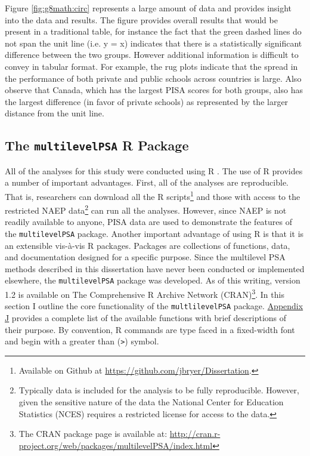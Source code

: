 \documentclass[letterpaper,12pt]{article} %
\begin{document}
Figure \ref{fig:g8math:circ} represents a large amount of data and provides insight into the data and results. The figure provides overall results that would be present in a traditional table, for instance the fact that the green dashed lines do not span the unit line (i.e. y = x) indicates that there is a statistically significant difference between the two groups. However additional information is difficult to convey in tabular format. For example, the rug plots indicate that the spread in the performance of both private and public schools across countries is large. Also observe that Canada, which has the largest PISA scores for both groups, also has the largest difference (in favor of private schools) as represented by the larger distance from the unit line.


\subsection{The \texttt{multilevelPSA} R Package}


All of the analyses for this study were conducted using R \cite{rdevelopment}. The use of R provides a number of important advantages. First, all of the analyses are reproducible. That is, researchers can download all the R scripts\footnote{Available on Github at \url{https://github.com/jbryer/Dissertation}.} and those with access to the restricted NAEP data\footnote{Typically data is included for the analysis to be fully reproducible. However, given the sensitive nature of the data the National Center for Education Statistics (NCES) requires a restricted license for access to the data.} can run all the analyses. However, since NAEP is not readily available to anyone, PISA data are used to demonstrate the features of the \texttt{multilevelPSA} package. Another important advantage of using R is that it is an extensible vis-\`{a}-vis R packages. Packages are collections of functions, data, and documentation designed for a specific purpose. Since the multilevel PSA methods described in this dissertation have never been conducted or implemented elsewhere, the \texttt{multilevelPSA} package was developed. As of this writing, version 1.2 is available on The Comprehensive R Archive Network (CRAN)\footnote{The CRAN package page is available at: \url{http://cran.r-project.org/web/packages/multilevelPSA/index.html}}. In this section I outline the core functionality of the \texttt{multlilevelPSA} package. \hyperref[appendixJ]{Appendix J} provides a complete list of the available functions with brief descriptions of their purpose. By convention, R commands are type faced in a fixed-width font and begin with a greater than (\texttt{>}) symbol.
\end{document}
